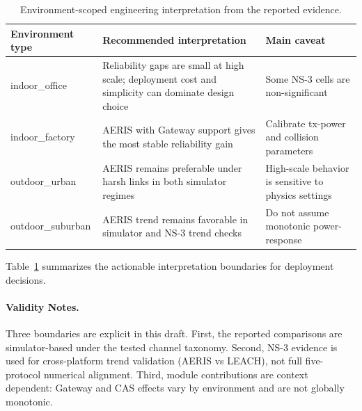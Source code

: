 ﻿\documentclass[sensors,article,submit,moreauthors,pdftex]{Definitions/mdpi}
\begin{document}
\begin{table}[H]
\caption{Environment-scoped engineering interpretation from the reported evidence.}
\label{tab:deployment_summary}
\centering
\small
\begin{tabular}{>{\raggedright\arraybackslash}p{} >{\raggedright\arraybackslash}p{} >{\raggedright\arraybackslash}p{}}
\toprule
Environment type & Recommended interpretation & Main caveat \\
\midrule
indoor\_office & Reliability gaps are small at high scale; deployment cost and simplicity can dominate design choice & Some NS-3 cells are non-significant \\
indoor\_factory & AERIS with Gateway support gives the most stable reliability gain & Calibrate tx-power and collision parameters \\
outdoor\_urban & AERIS remains preferable under harsh links in both simulator regimes & High-scale behavior is sensitive to physics settings \\
outdoor\_suburban & AERIS trend remains favorable in simulator and NS-3 trend checks & Do not assume monotonic power-response \\
\bottomrule
\end{tabular}
\normalsize
\end{table}

Table~\ref{tab:deployment_summary} summarizes the actionable interpretation boundaries for deployment decisions.

\paragraph{Validity Notes.}
Three boundaries are explicit in this draft. First, the reported comparisons are simulator-based under the tested channel taxonomy. Second, NS-3 evidence is used for cross-platform trend validation (AERIS vs LEACH), not full five-protocol numerical alignment. Third, module contributions are context dependent: Gateway and CAS effects vary by environment and are not globally monotonic.
\end{document}
